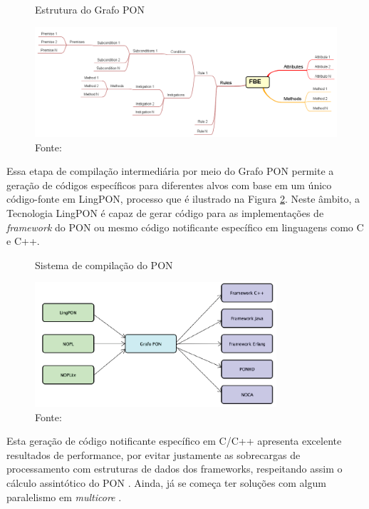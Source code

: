 \begin{figure}[!htb]
  \centering
  \caption{Estrutura do Grafo PON}
  \includegraphics[width=\textwidth]{../figures/grafo_pon_negrini.png}
  \smallskip
  \caption*{Fonte: }
  \label{fig:grafo_pon}
\end{figure}

Essa etapa de compilação intermediária por meio do Grafo PON permite  a geração
de códigos específicos para diferentes alvos com base em um único código-fonte
em LingPON, processo que é ilustrado na Figura \ref{fig:sistema_compilacao}.
Neste âmbito, a Tecnologia LingPON é capaz de gerar código para as
implementações de \textit{framework} do PON ou mesmo código notificante
específico em linguagens como C e C++. 

\begin{figure}[!htb]
  \centering
  \caption{Sistema de compilação do PON}
  \includegraphics[width=0.8\textwidth]{../figures/sistema_compilacao.png}
  \smallskip
  \caption*{Fonte: }
  \label{fig:sistema_compilacao}
\end{figure}

Esta geração de código notificante específico em C/C++ apresenta excelente
resultados de performance, por evitar justamente as sobrecargas de processamento
com estruturas de dados dos frameworks, respeitando assim o cálculo assintótico
do PON \cite{ronszcka_2017,doc_ronszcka_2019,oshiro_2021}. Ainda, já se começa
ter soluções com algum paralelismo em \textit{multicore}
\cite{doc_ronszcka_2019,martini_2021}.


